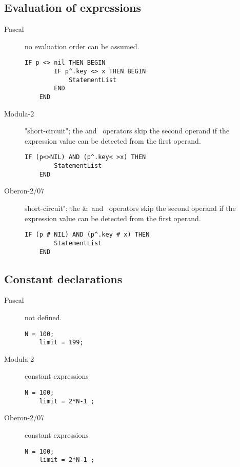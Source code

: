 \documentclass[10pt]{article}
\begin{document}
\subsection{Evaluation of expressions}
\begin{description}
    \item[Pascal] no evaluation order can be assumed.
    \begin{lstlisting}[style=example]   
    IF p <> nil THEN BEGIN
        IF p^.key <> x THEN BEGIN
            StatementList 
        END
    END     
    \end{lstlisting}
    
    \item[Modula-2] "short-circuit"; the \AND and \OR\ operators skip the second operand if the expression value can be detected from the first operand.
    \begin{lstlisting}[style=example]   
    IF (p<>NIL) AND (p^.key< >x) THEN
        StatementList 
    END   
    \end{lstlisting}
    
    \item[Oberon-2/07] short-circuit"; the \&\ and \OR\ operators skip the second operand if the expression value can be detected from the first operand.
    \begin{lstlisting}[style=example]   
    IF (p # NIL) AND (p^.key # x) THEN
        StatementList 
    END   
    \end{lstlisting}
\end{description}

\subsection{Constant declarations}
\begin{description}
    \item[Pascal] not defined.
    \begin{lstlisting}[style=example]   
    N = 100; 
    limit = 199;   
    \end{lstlisting}
    
    \item[Modula-2] constant expressions
    \begin{lstlisting}[style=example]   
    N = 100;
    limit = 2*N-1 ;  
    \end{lstlisting}
    
    \item[Oberon-2/07] constant expressions
    \begin{lstlisting}[style=example]   
    N = 100;
    limit = 2*N-1 ;  
    \end{lstlisting}
\end{description}
\end{document}
